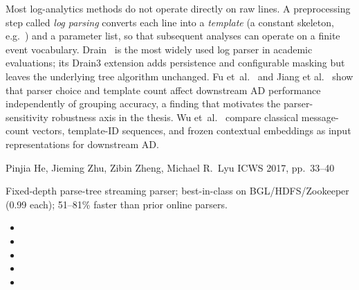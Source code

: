 Most log-analytics methods do not operate directly on raw lines. A
preprocessing step called \emph{log parsing} converts each line into a
\emph{template} (a constant skeleton, e.g.~) and a parameter list, so that subsequent analyses can
operate on a finite event vocabulary. Drain~\cite{drain} is the most
widely used log parser in academic evaluations; its Drain3 extension
adds persistence and configurable masking but leaves the underlying
tree algorithm unchanged. Fu et~al.~\cite{fu2023parser} and Jiang et
al.~\cite{jiang2024loghub2} show that parser choice and template count
affect downstream AD performance independently of grouping accuracy,
a finding that motivates the parser-sensitivity robustness axis in the
thesis. Wu et~al.~\cite{wu2023logrep} compare classical message-count
vectors, template-ID sequences, and frozen contextual embeddings as
input representations for downstream AD.

{Pinjia He, Jieming Zhu, Zibin Zheng, Michael R.\ Lyu}
{ICWS 2017, pp.\ 33--40}
{Fixed-depth parse-tree streaming parser; best-in-class on
BGL/HDFS/Zookeeper (0.99 each); 51--81\% faster than prior online
parsers.
\begin{itemize}[nosep]
  \item {}
  \item {}
  \item {}
  \item {}
  \item {}
\end{itemize}}

